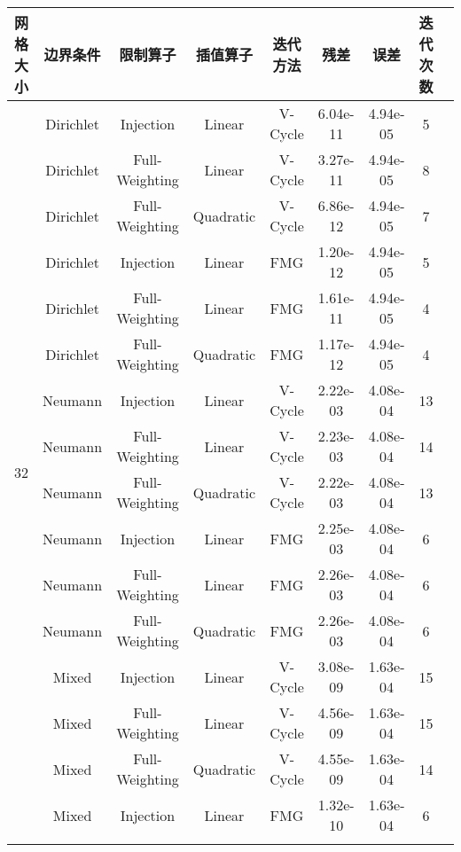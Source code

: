 \documentclass{ctexart}
\begin{document}
\begin{longtable}{ccccccccc} \hline
网格大小 & 边界条件 & 限制算子 & 插值算子 & 迭代方法 & 残差 & 误差 & 迭代次数\\ \hline
\multirow{18}{*}{32}	& Dirichlet	& Injection			& Linear	& V-Cycle	& 6.04e-11	& 4.94e-05	& 5		\\ \cline{2-8}
\multirow{18}{*}{}		& Dirichlet	& Full-Weighting	& Linear	& V-Cycle	& 3.27e-11	& 4.94e-05	& 8		\\ \cline{2-8}
\multirow{18}{*}{}		& Dirichlet	& Full-Weighting	& Quadratic	& V-Cycle	& 6.86e-12	& 4.94e-05	& 7		\\ \cline{2-8}
\multirow{18}{*}{}		& Dirichlet	& Injection			& Linear	& FMG		& 1.20e-12	& 4.94e-05	& 5		\\ \cline{2-8}
\multirow{18}{*}{}		& Dirichlet	& Full-Weighting	& Linear	& FMG		& 1.61e-11	& 4.94e-05	& 4		\\ \cline{2-8}
\multirow{18}{*}{}		& Dirichlet	& Full-Weighting	& Quadratic	& FMG		& 1.17e-12	& 4.94e-05	& 4		\\ \cline{2-8}
\multirow{18}{*}{}		& Neumann	& Injection			& Linear	& V-Cycle	& 2.22e-03	& 4.08e-04	& 13	\\ \cline{2-8}
\multirow{18}{*}{}		& Neumann	& Full-Weighting	& Linear	& V-Cycle	& 2.23e-03	& 4.08e-04	& 14	\\ \cline{2-8}
\multirow{18}{*}{}		& Neumann	& Full-Weighting	& Quadratic	& V-Cycle	& 2.22e-03	& 4.08e-04	& 13	\\ \cline{2-8}
\multirow{18}{*}{}		& Neumann	& Injection			& Linear	& FMG		& 2.25e-03	& 4.08e-04	& 6		\\ \cline{2-8}
\multirow{18}{*}{}		& Neumann	& Full-Weighting	& Linear	& FMG		& 2.26e-03	& 4.08e-04	& 6		\\ \cline{2-8}
\multirow{18}{*}{}		& Neumann	& Full-Weighting	& Quadratic	& FMG		& 2.26e-03	& 4.08e-04	& 6		\\ \cline{2-8}
\multirow{18}{*}{}		& Mixed		& Injection			& Linear	& V-Cycle	& 3.08e-09	& 1.63e-04	& 15	\\ \cline{2-8}
\multirow{18}{*}{}		& Mixed		& Full-Weighting	& Linear	& V-Cycle	& 4.56e-09	& 1.63e-04	& 15	\\ \cline{2-8}
\multirow{18}{*}{}		& Mixed		& Full-Weighting	& Quadratic	& V-Cycle	& 4.55e-09	& 1.63e-04	& 14	\\ \cline{2-8}
\multirow{18}{*}{}		& Mixed		& Injection			& Linear	& FMG		& 1.32e-10	& 1.63e-04	& 6		\\ \cline{2-8}

\end{longtable}
\end{document}
